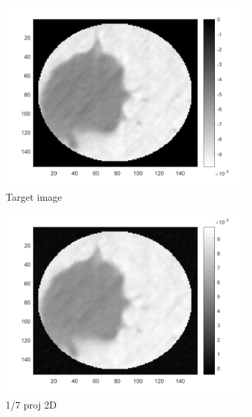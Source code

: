\begin{figure}[ht!]
      		\begin{subfigure}[b]{0.24\textwidth}
            	\centering
            	\includegraphics[width=\textwidth]{../../data/res/target1.png}
            	\caption{Target image}    
        	\end{subfigure}
        	\begin{subfigure}[b]{0.24\textwidth}  
            	\centering 
            	\includegraphics[width=\textwidth]{../../data/res/SB_Reconstruction/2D/Target1/1_7.png}
            	\caption{1/7 proj 2D}    
            	\label{subfig:156p1L-D}
        	\end{subfigure}
        	\begin{subfigure}[b]{0.24\textwidth}  

\end{subfigure}
\end{figure}
